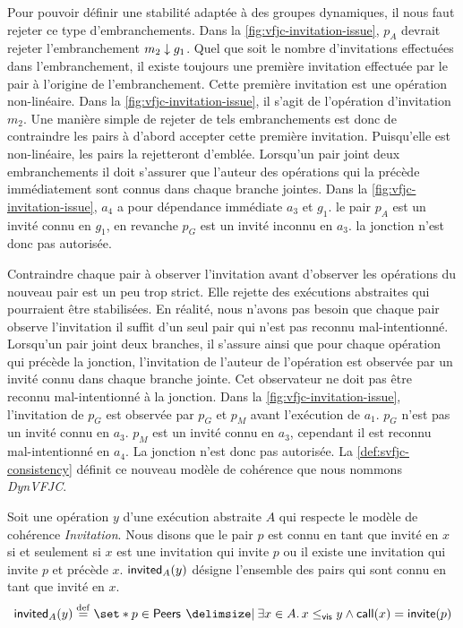 Pour pouvoir définir une stabilité adaptée à des groupes dynamiques, il nous faut rejeter ce type d'embranchements.
Dans la \autoref{fig:vfjc-invitation-issue}, $p_A$ devrait rejeter l'embranchement $m_2 \downarrow g_1$.
Quel que soit le nombre d'invitations effectuées dans l'embranchement, il existe toujours une première invitation effectuée par le pair à l'origine de l'embranchement.
Cette première invitation est une opération non-linéaire.
Dans la \autoref{fig:vfjc-invitation-issue}, il s'agit de l'opération d'invitation $m_2$.
Une manière simple de rejeter de tels embranchements est donc de contraindre les pairs à d'abord accepter cette première invitation.
Puisqu'elle est non-linéaire, les pairs la rejetteront d'emblée.
Lorsqu'un pair joint deux embranchements il doit s'assurer que l'auteur des opérations qui la précède immédiatement sont connus dans chaque branche jointes.
Dans la \autoref{fig:vfjc-invitation-issue}, $a_4$ a pour dépendance immédiate $a_3$ et $g_1$.
le pair $p_A$ est un invité connu en $g_1$, en revanche $p_G$ est un invité inconnu en $a_3$.
la jonction n'est donc pas autorisée.

Contraindre chaque pair à observer l'invitation avant d'observer les opérations du nouveau pair est un peu trop strict.
Elle rejette des exécutions abstraites qui pourraient être stabilisées.
En réalité, nous n'avons pas besoin que chaque pair observe l'invitation il suffit d'un seul pair qui n'est pas reconnu mal-intentionné.
Lorsqu'un pair joint deux branches, il s'assure ainsi que pour chaque opération qui précède la jonction, l'invitation de l'auteur de l'opération est observée par un invité connu dans chaque branche jointe.
Cet observateur ne doit pas être reconnu mal-intentionné à la jonction.
Dans la \autoref{fig:vfjc-invitation-issue}, l'invitation de $p_G$ est observée par $p_G$ et $p_M$ avant l'exécution de $a_1$.
$p_G$ n'est pas un invité connu en $a_3$.
$p_M$ est un invité connu en $a_3$, cependant il est reconnu mal-intentionné en $a_4$.
La jonction n'est donc pas autorisée.
La \autoref{def:svfjc-consistency} définit ce nouveau modèle de cohérence que nous nommons \emph{DynVFJC}.

\begin{definition}\label{def:known-invited}
Soit une opération $y$ d'une exécution abstraite $A$ qui respecte le modèle de cohérence \emph{Invitation}.
Nous disons que le pair $p$ est connu en tant que invité en $x$ si et seulement si $x$ est une invitation qui invite $p$ ou il existe une invitation qui invite $p$  et précède $x$.
$\operatorname{\mathsf{invited}}_A(y)$ désigne l'ensemble des pairs qui sont connu en tant que invité en $x$.
\begin{equation*}
    \trm{invited}_A(y) \defeq \set*{p \in \trm{Peers} \given \exists x \in A \qsep x \viseq y \land \trm{call}(x) = \trm{invite}(p)}
\end{equation*}
\end{definition}

